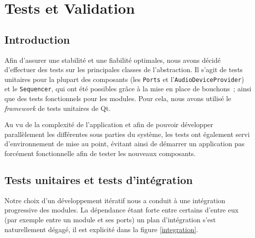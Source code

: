\section{Tests et Validation}

\subsection{Introduction}

Afin
d'assurer une stabilité et une fiabilité optimales, nous avons décidé d'effectuer des tests sur les principales classes de l'abstraction. Il s'agit de tests unitaires pour la plupart des composants (les \verb!Ports! et l'\verb!AudioDeviceProvider!) et le \verb!Sequencer!, qui ont été possibles grâce à la mise en place de bouchons~;
ainsi que des tests fonctionnels pour les modules.
Pour cela, nous avons utilisé le \emph{framework} de tests
unitaires de Qt.

Au vu de la complexité de l'application et afin de pouvoir développer parallèlement les différentes sous parties du système, les tests ont également servi d'environnement de mise au point, évitant ainsi de démarrer un application pas forcément fonctionnelle afin de tester les nouveaux composants.

\subsection{Tests unitaires et tests d'intégration}

Notre choix d'un développement itératif nous a conduit à une intégration progressive des modules. La dépendance étant forte entre certains d'entre eux (par exemple entre un module et ses ports) un plan d'intégration s'est naturellement dégagé, il est explicité dans la figure \ref{integration}.

